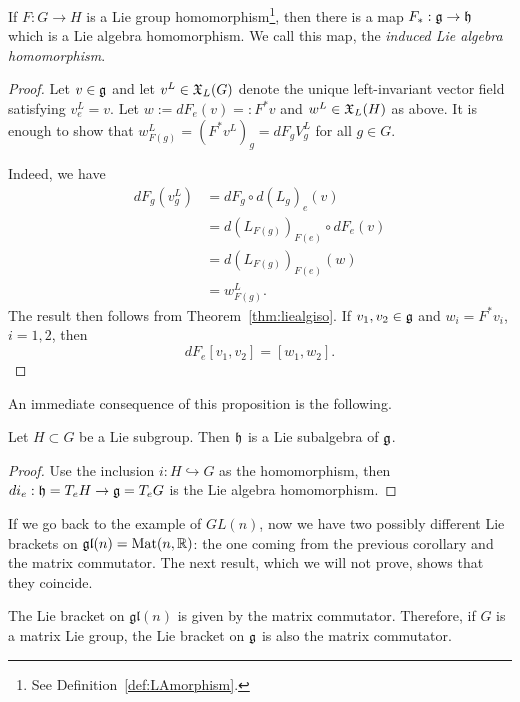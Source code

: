 \begin{proposition}
	If $F: G\to H$ is a Lie group homomorphism\footnote{See Definition~\ref{def:LAmorphism}.}, then there is a map $F_*:\mathfrak{g}\to\mathfrak{h}$ which is a Lie algebra homomorphism. We call this map, the \emph{induced Lie algebra homomorphism}.
\end{proposition}
\begin{proof}
	Let $v\in\mathfrak{g}$ and let $v^L\in\mathfrak{X}_L(G)$ denote the unique left-invariant vector field satisfying $v^L_e = v$.
	Let $w := dF_e(v) =: F^*v$ and $w^L\in\mathfrak{X}_L(H)$ as above.
	It is enough to show that $w^L_{F(g)} = (F^*v^L)_g = dF_g V^L_g$ for all $g\in G$.

	Indeed, we have
	\begin{align}
		dF_g(v^L_g) & = dF_g\circ d(L_g)_e(v)          \\
		            & =d(L_{F(g)})_{F(e)}\circ dF_e(v) \\
		            & =d(L_{F(g)})_{F(e)}(w)           \\
		            & =w^L_{F(g)}.
	\end{align}
	The result then follows from Theorem~\ref{thm:liealgiso}.
	If $v_1,v_2 \in\mathfrak{g}$ and $w_i=F^*v_i$, $i=1,2$, then
	\begin{equation}
		dF_e[v_1,v_2] = [w_1, w_2].
	\end{equation}
\end{proof}

An immediate consequence of this proposition is the following.
\begin{corollary}
	Let $H\subset G$ be a Lie subgroup.
	Then $\mathfrak{h}$ is a Lie subalgebra of $\mathfrak{g}$.
\end{corollary}
\begin{proof}
	Use the inclusion $i:H\hookrightarrow G$ as the homomorphism, then $di_e:\mathfrak{h} = T_eH\to \mathfrak{g} = T_eG$ is the Lie algebra homomorphism.
\end{proof}

If we go back to the example of $GL(n)$, now we have two possibly different Lie brackets on $\mathfrak{gl}(n)=\mathrm{Mat}(n, \mathbb{R})$: the one coming from the previous corollary and the matrix commutator.
The next result, which we will not prove, shows that they coincide.

\begin{proposition}
	The Lie bracket on $\mathfrak{gl}(n)$ is given by the matrix commutator.
	Therefore, if $G$ is a matrix Lie group, the Lie bracket on $\mathfrak{g}$ is also the matrix commutator.
\end{proposition}

